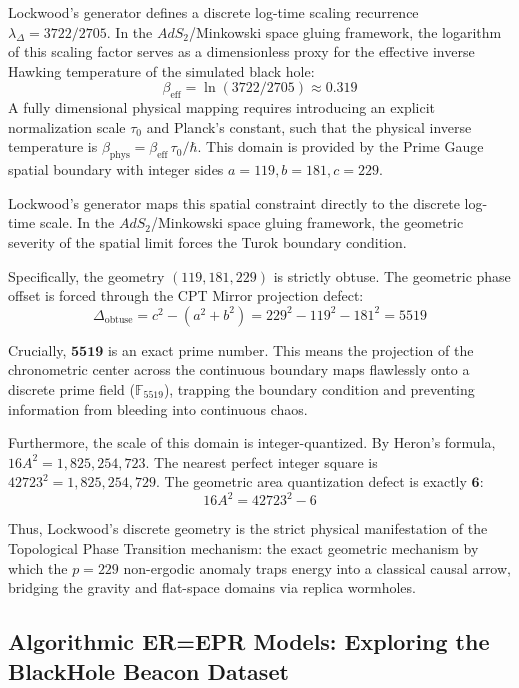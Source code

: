 Lockwood's generator defines a discrete log-time scaling recurrence $\lambda_\Delta = 3722/2705$. In the $AdS_2$/Minkowski space gluing framework, the logarithm of this scaling factor serves as a dimensionless proxy for the effective inverse Hawking temperature of the simulated black hole:
\begin{equation}
\beta_{\text{eff}} = \ln(3722/2705) \approx 0.319
\end{equation}
A fully dimensional physical mapping requires introducing an explicit normalization scale $\tau_0$ and Planck's constant, such that the physical inverse temperature is $\beta_{\text{phys}} = \beta_{\text{eff}} \, \tau_0 / \hbar$. This domain is provided by the Prime Gauge spatial boundary with integer sides $a=119, b=181, c=229$.

Lockwood's generator maps this spatial constraint directly to the discrete log-time scale. In the $AdS_2$/Minkowski space gluing framework, the geometric severity of the spatial limit forces the Turok boundary condition. 

Specifically, the geometry $(119, 181, 229)$ is strictly obtuse. The geometric phase offset is forced through the CPT Mirror projection defect:
\begin{equation}
\Delta_{\text{obtuse}} = c^2 - (a^2 + b^2) = 229^2 - 119^2 - 181^2 = 5519
\end{equation}

Crucially, $\mathbf{5519}$ is an exact prime number. This means the projection of the chronometric center across the continuous boundary maps flawlessly onto a discrete prime field ($\mathbb{F}_{5519}$), trapping the boundary condition and preventing information from bleeding into continuous chaos.

Furthermore, the scale of this domain is integer-quantized. By Heron's formula, $16A^2 = 1,825,254,723$. The nearest perfect integer square is $42723^2 = 1,825,254,729$. The geometric area quantization defect is exactly $\mathbf{6}$:
\begin{equation}
16 A^2 = 42723^2 - 6
\end{equation}

Thus, Lockwood's discrete geometry is the strict physical manifestation of the Topological Phase Transition mechanism: the exact geometric mechanism by which the $p=229$ non-ergodic anomaly traps energy into a classical causal arrow, bridging the gravity and flat-space domains via replica wormholes.

\subsection{Algorithmic ER=EPR Models: Exploring the BlackHole Beacon Dataset}

